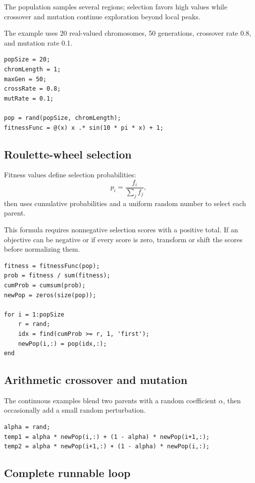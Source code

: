 The population samples several regions; selection favors high values while crossover and mutation continue exploration beyond local peaks.

The example uses 20 real-valued chromosomes, 50 generations, crossover rate 0.8, and mutation rate 0.1.

\begin{lstlisting}[style=mlmatlab]
popSize = 20;
chromLength = 1;
maxGen = 50;
crossRate = 0.8;
mutRate = 0.1;

pop = rand(popSize, chromLength);
fitnessFunc = @(x) x .* sin(10 * pi * x) + 1;
\end{lstlisting}

\subsection{Roulette-wheel selection}

Fitness values define selection probabilities:
\[
p_i=\frac{f_i}{\sum_j f_j},
\]
then uses cumulative probabilities and a uniform random number to select each parent.

This formula requires nonnegative selection scores with a positive total. If an objective can be negative or if every score is zero, transform or shift the scores before normalizing them.

\begin{lstlisting}[style=mlmatlab]
fitness = fitnessFunc(pop);
prob = fitness / sum(fitness);
cumProb = cumsum(prob);
newPop = zeros(size(pop));

for i = 1:popSize
    r = rand;
    idx = find(cumProb >= r, 1, 'first');
    newPop(i,:) = pop(idx,:);
end
\end{lstlisting}

\subsection{Arithmetic crossover and mutation}

The continuous examples blend two parents with a random coefficient \(\alpha\), then occasionally add a small random perturbation.

\begin{lstlisting}[style=mlmatlab]
alpha = rand;
temp1 = alpha * newPop(i,:) + (1 - alpha) * newPop(i+1,:);
temp2 = alpha * newPop(i+1,:) + (1 - alpha) * newPop(i,:);
\end{lstlisting}

\subsection{Complete runnable loop}

